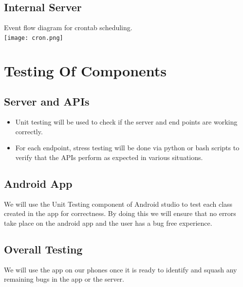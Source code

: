 \documentclass{article}
\begin{document}
			\subsection{Internal Server}
				Event flow diagram for crontab scheduling. \\
					\texttt{[image: cron.png]}
	
	\section{Testing Of Components}
			\subsection{Server and APIs}
				\begin{itemize}
					\item Unit testing will be used to check if the server and end points are working correctly.
					\item For each endpoint, stress testing will be done via python or bash scripts to verify that the APIs perform as expected in various situations.
				\end{itemize}
			\subsection{Android App}
				We will use the Unit Testing component of Android studio to test each class created in the app for correctness. By doing this we will ensure that no errors take place on the android app and the user has a bug free experience.
			\subsection{Overall Testing}
				We will use the app on our phones once it is ready to identify and squash any remaining bugs in the app or the server. 	
\end{document}
